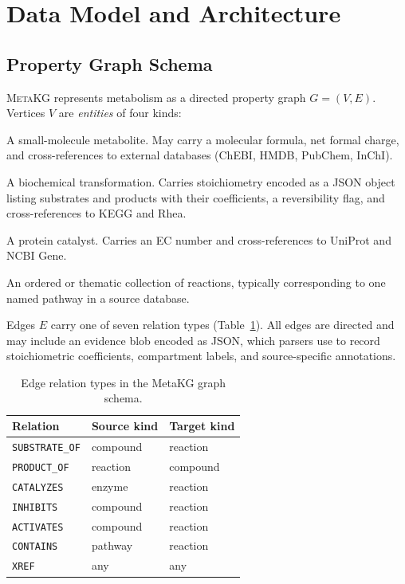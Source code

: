 \documentclass[10pt]{article}
\begin{document}
\section{Data Model and Architecture}
\label{sec:design}

\subsection{Property Graph Schema}

\textsc{MetaKG} represents metabolism as a directed property graph
$G = (V, E)$. Vertices $V$ are \emph{entities} of four kinds:

\begin{description}[leftmargin=*, itemsep=2pt]
  \item[\texttt{compound}] A small-molecule metabolite. May carry a molecular
    formula, net formal charge, and cross-references to external databases
    (ChEBI, HMDB, PubChem, InChI).
  \item[\texttt{reaction}] A biochemical transformation. Carries stoichiometry
    encoded as a JSON object listing substrates and products with their
    coefficients, a reversibility flag, and cross-references to KEGG and Rhea.
  \item[\texttt{enzyme}] A protein catalyst. Carries an EC number and
    cross-references to UniProt and NCBI Gene.
  \item[\texttt{pathway}] An ordered or thematic collection of reactions,
    typically corresponding to one named pathway in a source database.
\end{description}

Edges $E$ carry one of seven relation types (Table~\ref{tab:relations}).
All edges are directed and may include an evidence blob encoded as JSON,
which parsers use to record stoichiometric coefficients, compartment labels,
and source-specific annotations.

\begin{table}[H]
  \centering
  \caption{Edge relation types in the MetaKG graph schema.}
  \label{tab:relations}
  \small
  \begin{tabular}{@{}lll@{}}
    \toprule
    Relation & Source kind & Target kind \\
    \midrule
    \texttt{SUBSTRATE\_OF}  & compound  & reaction  \\
    \texttt{PRODUCT\_OF}    & reaction  & compound  \\
    \texttt{CATALYZES}      & enzyme    & reaction  \\
    \texttt{INHIBITS}       & compound  & reaction  \\
    \texttt{ACTIVATES}      & compound  & reaction  \\
    \texttt{CONTAINS}       & pathway   & reaction  \\
    \texttt{XREF}           & any       & any       \\
    \bottomrule
  \end{tabular}
\end{table}
\end{document}
